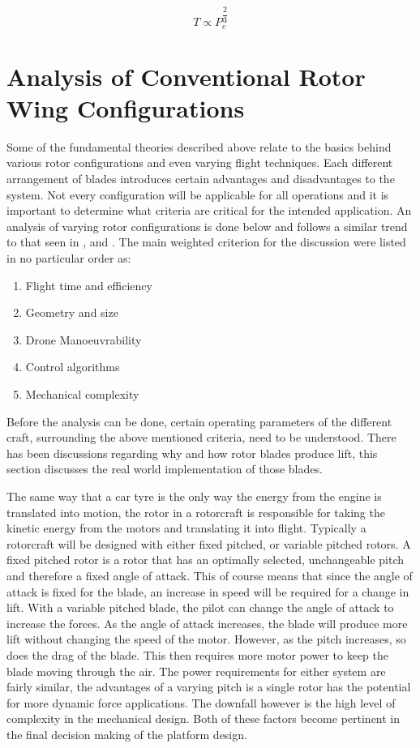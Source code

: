 	\begin{equation*}
	T \propto P_e^{\dfrac{2}{3}}
	\end{equation*}

\section{Analysis of Conventional Rotor Wing Configurations}

Some of the fundamental theories described above relate to the basics behind various rotor configurations and even varying flight techniques. Each different arrangement of blades introduces certain advantages and disadvantages to the system. Not every configuration will be applicable for all operations and it is important to determine what criteria are critical for the intended application.  An analysis of varying rotor configurations is done below and follows a similar trend to that seen in \cite{RotorConfig}, \cite{Bohorquez} and \cite{NewMAV}. The main weighted criterion for the discussion were listed in no particular order as:

\begin{enumerate}
	\item Flight time and efficiency
	\item Geometry and size
	\item Drone Manoeuvrability
	\item Control algorithms
	\item Mechanical complexity
\end{enumerate}

Before the analysis can be done, certain operating parameters of the different craft, surrounding the above mentioned criteria, need to be understood. There has been discussions regarding why and how rotor blades produce lift, this section discusses the real world implementation of those blades.


The same way that a car tyre is the only way the energy from the engine is translated into motion, the rotor in a rotorcraft is responsible for taking the kinetic energy from the motors and translating it into flight. Typically a rotorcraft will be designed with either fixed pitched, or variable pitched rotors. A fixed pitched rotor is a rotor that has an optimally selected, unchangeable pitch and therefore a fixed angle of attack. This of course means that since the angle of attack is fixed for the blade, an increase in speed will be required for a change in lift. With a variable pitched blade, the pilot can change the angle of attack to increase the forces. As the angle of attack increases, the blade will produce more lift without changing the speed of the motor. However, as the pitch increases, so does the drag of the blade. This then requires more motor power to keep the blade moving through the air.
The power requirements for either system are fairly similar, the advantages of a varying pitch is a single rotor has the potential for more dynamic force applications. The downfall however is the high level of complexity in the mechanical design. Both of these factors become pertinent in the final decision making of the platform design.

